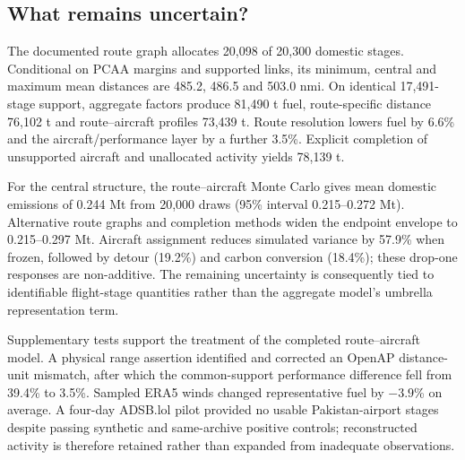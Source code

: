 \subsection{What remains uncertain?}

The documented route graph allocates 20,098 of 20,300 domestic stages. Conditional on PCAA
margins and supported links, its minimum, central and maximum mean distances are 485.2, 486.5
and 503.0 nmi. On identical 17,491-stage support, aggregate factors produce 81,490 t fuel,
route-specific distance 76,102 t and route--aircraft profiles 73,439 t. Route resolution lowers
fuel by 6.6\% and the aircraft/performance layer by a further 3.5\%. Explicit completion of
unsupported aircraft and unallocated activity yields 78,139 t.

For the central structure, the route--aircraft Monte Carlo gives mean domestic emissions of
0.244 Mt \COtwo{} from 20,000 draws
(95\% interval 0.215--0.272 Mt). Alternative route graphs and completion methods widen the
endpoint envelope to 0.215--0.297 Mt. Aircraft assignment reduces simulated variance by
57.9\% when frozen, followed by detour (19.2\%) and carbon conversion (18.4\%); these drop-one
responses are non-additive. The remaining uncertainty is consequently tied to identifiable
flight-stage quantities rather than the aggregate model's umbrella representation term.

Supplementary tests support the treatment of the completed route--aircraft model. A physical
range assertion identified and corrected an OpenAP distance-unit mismatch, after which the
common-support performance difference fell from 39.4\% to 3.5\%. Sampled ERA5 winds changed
representative fuel by $-3.9$\% on average. A four-day ADSB.lol pilot provided no usable
Pakistan-airport stages despite passing synthetic and same-archive positive controls;
reconstructed activity is therefore retained rather than expanded from inadequate
observations.
